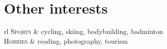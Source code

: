 \section{Other interests}
\begin{table}[h!tbp]
    \centering
    \begin{tblr}{rl}
        \textsc{Sports} & cycling, skiing, bodybuilding, badminton \\
        \textsc{Hobbies} & reading, photography, tourism \\
    \end{tblr}
\end{table}